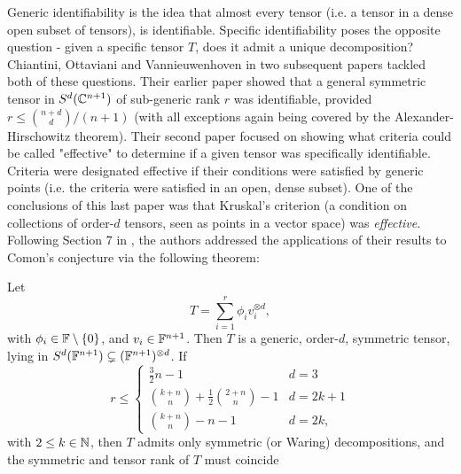 \documentclass[../Lael_John_MasterThesis_Draft.tex]{subfiles}
\begin{document}

Generic identifiability is the idea that almost every tensor (i.e. a tensor in a dense open subset of tensors), is identifiable. Specific identifiability poses the opposite question - given a specific tensor $T$, does it admit a unique decomposition? Chiantini, Ottaviani and Vannieuwenhoven \cites{chiantini_generic_2016, chiantini_effective_2017} in two subsequent papers tackled both of these questions. Their earlier paper showed that a general symmetric tensor in $S^d(\mathbb{C}^{n+1})$ of sub-generic rank $r$ was identifiable, provided $r \leq \binom{n+d}{d}/(n+1)$ (with all exceptions again being covered by the Alexander-Hirschowitz theorem). Their second paper focused on showing what criteria could be called "effective" to determine if a given tensor was specifically identifiable. Criteria were designated effective if their conditions were satisfied by generic points (i.e. the criteria were satisfied in an open, dense subset). One of the conclusions of this last paper was that Kruskal's criterion (a condition on collections of order-$d$ tensors, seen as points in a vector space) was \textit{effective}. Following Section 7 in \cite{chiantini_effective_2017}, the authors addressed the applications of their results to Comon's conjecture via the following theorem:
\begin{theorem}
	Let $$T = \sum_{i=1}^{r}\phi_iv_i^{\otimes d},$$ with $\phi_i \in \mathbb{F}\setminus\{0\}$, and $v_i \in \mathbb{F}^{n+1}$. Then $T$ is a generic, order-$d$, symmetric tensor, lying in $S^d(\mathbb{F}^{n+1}) \subsetneq (\mathbb{F}^{n+1})^{\otimes d}$. If \begin{equation*}
		r \leq \begin{cases}
			\frac{3}{2}n -1 &  d = 3\\
			\binom{k+n}{n} + \frac{1}{2}\binom{2+n}{n} -1 & d = 2k + 1\\
			\binom{k+n}{n} -n -1 & d = 2k,
		\end{cases}
	\end{equation*}
	with $2 \leq k \in \mathbb{N}$, then $T$ admits only symmetric (or Waring) decompositions, and the symmetric and tensor rank of $T$ must coincide
\end{theorem}
\end{document}
